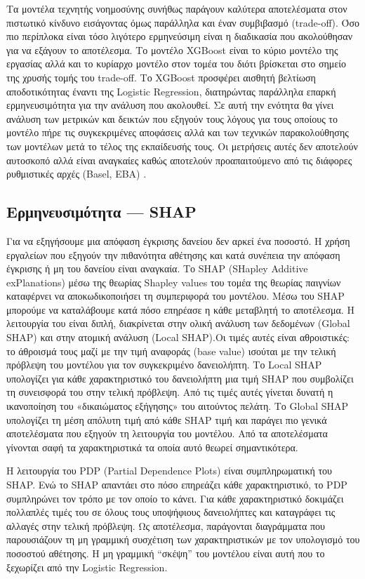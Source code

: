 Τα μοντέλα τεχνητής νοημοσύνης συνήθως παράγουν καλύτερα αποτελέσματα στον
πιστωτικό κίνδυνο εισάγοντας όμως παράλληλα και έναν συμβιβασμό (trade-off).
Όσο πιο περίπλοκα είναι τόσο λιγότερο ερμηνεύσιμη είναι η διαδικασία που
ακολούθησαν για να εξάγουν το αποτέλεσμα. Το μοντέλο XGBoost είναι το κύριο
μοντέλο της εργασίας αλλά και το κυρίαρχο μοντέλο στον τομέα του διότι
βρίσκεται στο σημείο της χρυσής τομής του trade-off. Το XGBoost προσφέρει
αισθητή βελτίωση αποδοτικότητας έναντι της Logistic Regression, διατηρώντας
παράλληλα επαρκή ερμηνευσιμότητα για την ανάλυση που ακολουθεί. Σε αυτή την
ενότητα θα γίνει ανάλυση των μετρικών και δεικτών που εξηγούν τους λόγους για
τους οποίους το μοντέλο πήρε τις συγκεκριμένες αποφάσεις αλλά και των τεχνικών
παρακολούθησης των μοντέλων μετά το τέλος της εκπαίδευσής τους. Οι μετρήσεις
αυτές δεν αποτελούν αυτοσκοπό αλλά είναι αναγκαίες καθώς αποτελούν
προαπαιτούμενο από τις διάφορες ρυθμιστικές αρχές (Basel, EBA) \citep{basel2017, eba2023}.

\subsection{Ερμηνευσιμότητα --- SHAP}
\label{sec:shap}

Για να εξηγήσουμε μια απόφαση έγκρισης δανείου δεν αρκεί ένα ποσοστό.
Η χρήση εργαλείων που εξηγούν την πιθανότητα αθέτησης και κατά συνέπεια
την απόφαση έγκρισης ή μη του δανείου είναι αναγκαία. Το SHAP (SHapley
Additive exPlanations) μέσω της θεωρίας Shapley values του τομέα της
θεωρίας παιγνίων καταφέρνει να αποκωδικοποιήσει τη συμπεριφορά του
μοντέλου. Μέσω του SHAP μπορούμε να καταλάβουμε κατά πόσο επηρέασε η
κάθε μεταβλητή το αποτέλεσμα. Η λειτουργία του είναι διπλή, διακρίνεται
στην ολική ανάλυση των δεδομένων (Global SHAP) και στην ατομική ανάλυση
(Local SHAP).Οι τιμές αυτές είναι αθροιστικές: το άθροισμά τους μαζί με
την τιμή αναφοράς (base value) ισούται με την τελική πρόβλεψη του μοντέλου
για τον συγκεκριμένο δανειολήπτη.
Το Local SHAP υπολογίζει για κάθε χαρακτηριστικό του
δανειολήπτη μια τιμή SHAP που συμβολίζει τη συνεισφορά του στην τελική
πρόβλεψη. Από τις τιμές αυτές γίνεται δυνατή η ικανοποίηση του
«δικαιώματος εξήγησης» του αιτούντος πελάτη. Το Global SHAP υπολογίζει
τη μέση απόλυτη τιμή από κάθε SHAP τιμή και παράγει πιο γενικά
αποτελέσματα που εξηγούν τη λειτουργία του μοντέλου. Από τα αποτελέσματα
γίνονται σαφή τα χαρακτηριστικά τα οποία αυτό θεωρεί σημαντικότερα.

Η λειτουργία του PDP (Partial Dependence Plots) \citep{molnar2022, hastie2009} είναι συμπληρωματική του SHAP.
Ενώ το SHAP απαντάει στο πόσο επηρεάζει κάθε χαρακτηριστικό, το PDP
συμπληρώνει τον τρόπο με τον οποίο το κάνει. Για κάθε χαρακτηριστικό
δοκιμάζει πολλαπλές τιμές του σε όλους τους υποψήφιους δανειολήπτες και
καταγράφει τις αλλαγές στην τελική πρόβλεψη. Ως αποτέλεσμα, παράγονται
διαγράμματα που παρουσιάζουν τη μη γραμμική συσχέτιση των χαρακτηριστικών
με τον υπολογισμό του ποσοστού αθέτησης. Η μη γραμμική ``σκέψη'' του
μοντέλου είναι αυτή που το ξεχωρίζει από την Logistic Regression.


